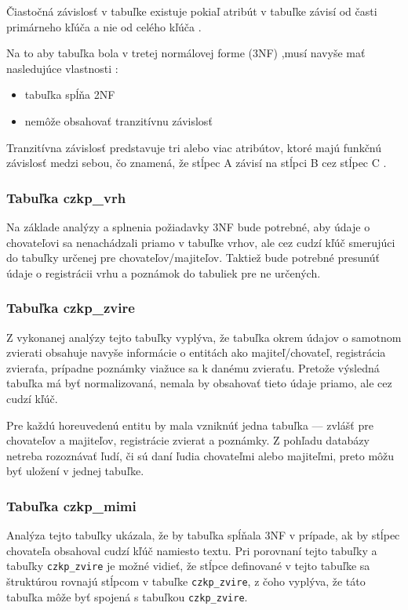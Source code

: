 Čiastočná závislosť v tabuľke existuje pokiaľ atribút v tabuľke závisí od časti primárneho kľúča a nie od celého kľúča \cite{ciastocna-zavislost}. 

Na to aby tabuľka bola v tretej normálovej forme (3NF) ,musí navyše mať nasledujúce vlastnosti \cite{typy-normalizacie}:
\begin{itemize}
	\item tabuľka spĺňa 2NF
	\item nemôže obsahovať tranzitívnu závislosť
\end{itemize}

Tranzitívna závislosť predstavuje tri alebo viac atribútov, ktoré majú funkčnú závislosť medzi sebou, čo znamená, že stĺpec A závisí na stĺpci B cez stĺpec C \cite{tranzitivna-zavislost}.

\subsubsection*{Tabuľka czkp\_vrh}
Na základe analýzy a splnenia požiadavky 3NF bude potrebné, aby údaje o chovateľovi sa nenachádzali priamo v tabuľke vrhov, ale cez cudzí kľúč smerujúci do tabuľky určenej pre chovateľov/majiteľov.
Taktiež bude potrebné presunúť údaje o registrácii vrhu a poznámok do tabuliek pre ne určených.

\subsubsection*{Tabuľka czkp\_zvire}
Z vykonanej analýzy tejto tabuľky vyplýva, že tabuľka okrem údajov o samotnom zvierati obsahuje navyše informácie o entitách ako majiteľ/chovateľ, registrácia zvieraťa, prípadne poznámky viažuce sa k danému zvieraťu. Pretože výsledná tabuľka má byť normalizovaná, nemala by obsahovať tieto údaje priamo, ale cez cudzí kľúč.

Pre každú horeuvedenú entitu by mala vzniknúť jedna tabuľka --- zvlášť pre chovateľov a majiteľov, registrácie zvierat a poznámky. Z pohľadu databázy netreba rozoznávať ľudí, či sú daní ľudia chovateľmi alebo majiteľmi, preto môžu byť uložení v jednej tabuľke.

\subsubsection*{Tabuľka czkp\_mimi}
Analýza tejto tabuľky ukázala, že by tabuľka spĺňala 3NF v prípade, ak by stĺpec chovateľa obsahoval cudzí kľúč namiesto textu.
Pri porovnaní tejto tabuľky a tabuľky \texttt{czkp_zvire} je možné vidieť, že stĺpce definované v tejto tabuľke sa štruktúrou rovnajú stĺpcom v tabuľke \texttt{czkp_zvire}, z čoho vyplýva, že táto tabuľka môže byť spojená s tabuľkou \texttt{czkp_zvire}.

